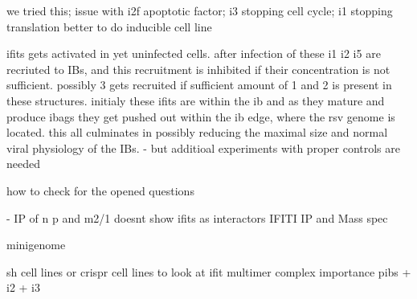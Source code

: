 we tried this; issue with i2f apoptotic factor; i3 stopping cell cycle; i1 stopping translation
better to do inducible cell line


ifits gets activated in yet uninfected cells. after infection of these i1 i2 i5 are recriuted to IBs, and this recruitment is inhibited if their concentration is not sufficient. possibly 3 gets recruited if sufficient amount of 1 and 2 is present in these structures. initialy these ifits are within the ib and as they mature and produce ibags they get pushed out within the ib edge, where the rsv genome is located. this all culminates in possibly reducing the maximal size and normal viral physiology of the IBs. - but additioal experiments with proper controls are needed

how to check for the opened questions

\cite{Oliveira2013HumanCells} - IP of n p and m2/1 doesnt show ifits as interactors
IFITI IP and Mass spec

minigenome \cite{Teng2016UseTranscription}

sh cell lines or crispr cell lines to look at ifit multimer complex importance
pibs + i2 + i3



